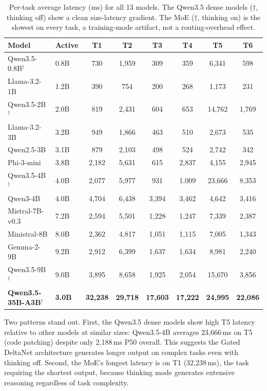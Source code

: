 \documentclass[11pt]{article}
\begin{document}
\begin{table}[t]
\centering
\caption{Per-task average latency (ms) for all 13 models.  The Qwen3.5 dense models ($\dagger$, thinking off) show a clean size-latency gradient.  The MoE ($\dagger$, thinking on) is the slowest on every task, a training-mode artifact, not a routing-overhead effect.}
\label{tab:app-per-task-latency}
\small
\begin{tabular}{ll cccccc}
\toprule
\textbf{Model} & \textbf{Active} & \textbf{T1} & \textbf{T2} & \textbf{T3} & \textbf{T4} & \textbf{T5} & \textbf{T6} \\
\midrule
Qwen3.5-0.8B$^\dagger$ & 0.8B & 730 & 1,959 & 309 & 359 & 6,341 & 598 \\
Llama-3.2-1B & 1.2B & 390 & 754 & 200 & 268 & 1,173 & 231 \\
Qwen3.5-2B$^\dagger$ & 2.0B & 819 & 2,431 & 604 & 653 & 14,762 & 1,769 \\
Llama-3.2-3B & 3.2B & 949 & 1,866 & 463 & 510 & 2,673 & 535 \\
Qwen2.5-3B & 3.1B & 879 & 2,103 & 498 & 524 & 2,742 & 342 \\
Phi-3-mini & 3.8B & 2,182 & 5,631 & 615 & 2,837 & 4,155 & 2,945 \\
Qwen3.5-4B$^\dagger$ & 4.0B & 2,077 & 5,977 & 931 & 1,009 & 23,666 & 8,353 \\
Qwen3-4B & 4.0B & 4,704 & 6,438 & 3,394 & 3,462 & 4,642 & 3,416 \\
Mistral-7B-v0.3 & 7.2B & 2,594 & 5,501 & 1,228 & 1,247 & 7,339 & 2,387 \\
Ministral-8B & 8.0B & 2,362 & 4,817 & 1,051 & 1,115 & 7,005 & 1,343 \\
Gemma-2-9B & 9.2B & 2,912 & 6,399 & 1,637 & 1,634 & 8,981 & 2,240 \\
Qwen3.5-9B$^\dagger$ & 9.0B & 3,895 & 8,658 & 1,925 & 2,054 & 15,670 & 3,856 \\
\midrule
\rowcolor{moepurple!8}
\textbf{Qwen3.5-35B-A3B}$^\dagger$ & \textbf{3.0B} & \textbf{32,238} & \textbf{29,718} & \textbf{17,603} & \textbf{17,222} & \textbf{24,995} & \textbf{22,086} \\
\bottomrule
\end{tabular}
\end{table}

Two patterns stand out.  First, the Qwen3.5 dense models show high T5 latency relative to other models at similar sizes: Qwen3.5-4B averages 23,666\,ms on T5 (code patching) despite only 2,188\,ms P50 overall.  This suggests the Gated DeltaNet architecture generates longer output on complex tasks even with thinking off.  Second, the MoE's longest latency is on T1 (32,238\,ms), the task requiring the shortest output, because thinking mode generates extensive reasoning regardless of task complexity.
\end{document}
